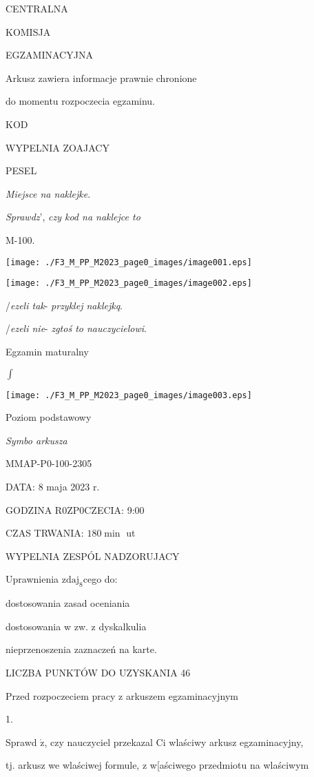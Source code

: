 \documentclass[a4paper,12pt]{article}
\begin{document}
CENTRALNA

KOMISJA

EGZAMINACYJNA

Arkusz zawiera informacje prawnie chronione

do momentu rozpoczecia egzaminu.

KOD

WYPELNIA ZOAJACY

PESEL

{\it Miejsce na naklejke}.

{\it Sprawdz}', {\it czy kod na naklejce to}

M-100.
\begin{center}
\texttt{[image: ./F3\_M\_PP\_M2023\_page0\_images/image001.eps]}

\texttt{[image: ./F3\_M\_PP\_M2023\_page0\_images/image002.eps]}
\end{center}
/{\it ezeli tak}- {\it przyklej naklejkq}.

/{\it ezeli nie}- {\it zgtoś to nauczycielowi}.

Egzamin maturalny

$\displaystyle \int$
\begin{center}
\texttt{[image: ./F3\_M\_PP\_M2023\_page0\_images/image003.eps]}
\end{center}
Poziom  podstawowy

{\it Symbo arkusza}

MMAP-P0-100-2305

DATA: 8 maja 2023 r.

GODZINA R0ZP0CZECIA: 9:00

CZAS TRWANIA: $180 \displaystyle \min$ ut

WYPELNIA ZESPÓL NADZORUJACY

Uprawnienia $\mathrm{z}\mathrm{d}\mathrm{a}\mathrm{j}_{8}$cego do:

\fbox{} dostosowania zasad oceniania

\fbox{} dostosowania w zw. z dyskalkulia

\fbox{} nieprzenoszenia zaznaczeń na karte.

LICZBA PUNKTÓW DO UZYSKANIA 46

Przed rozpoczeciem pracy z arkuszem egzaminacyjnym

1.

Sprawd $\acute{\mathrm{z}}$, czy nauczyciel przekazal Ci wlaściwy arkusz egzaminacyjny,

tj. arkusz we wlaściwej formule, z w[aściwego przedmiotu na wlaściwym
\end{document}
